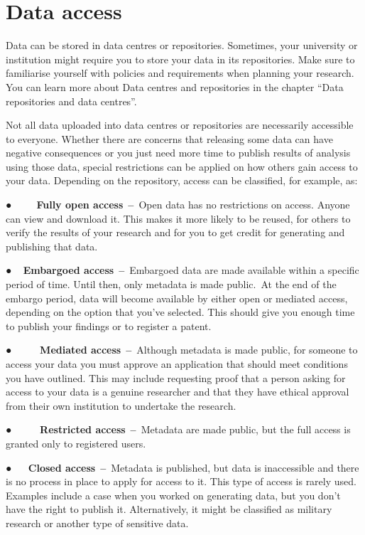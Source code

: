 \documentclass[
]{book}
\begin{document}
\hypertarget{data-access}{%
\section{\texorpdfstring{\textbf{Data access}}{Data access}}\label{data-access}}

Data can be stored in data centres or repositories. Sometimes, your university or institution might require you to store your data in its repositories. Make sure to familiarise yourself with policies and requirements when planning your research. You can learn more about Data centres and repositories in the chapter ``Data repositories and data centres''.

Not all data uploaded into data centres or repositories are necessarily accessible to everyone. Whether there are concerns that releasing some data can have negative consequences or you just need more time to publish results of analysis using those data, special restrictions can be applied on how others gain access to your data. Depending on the repository, access can be classified, for example, as:

● ~ ~ ~\textbf{Fully open access}~\textbf{--}~Open data has no restrictions on access. Anyone can view and download it. This makes it more likely to be reused, for others to verify the results of your research and for you to get credit for generating and publishing that data.

● ~ \textbf{Embargoed access}~\textbf{--}~Embargoed data are made available within a specific period of time. Until then, only metadata is made public.~At the end of the embargo period, data will become available by either open or mediated access, depending on the option that you've selected. This should give you enough time to publish your findings or to register a patent.

● ~ ~ ~ \textbf{Mediated access}~\textbf{--}~Although metadata is made public, for someone to access your data you must approve an application that should meet conditions you have outlined. This may include requesting proof that a person asking for access to your data is a genuine researcher and that they have ethical approval from their own institution to undertake the research.

● ~ ~ ~ \textbf{Restricted access}~\textbf{--}~Metadata are made public, but the full access is granted only to registered users.

● ~ ~\textbf{Closed access}~\textbf{--}~Metadata is published, but data is inaccessible and there is no process in place to apply for access to it. This type of access is rarely used. Examples include a case when you worked on generating data, but you don't have the right to publish it. Alternatively, it might be classified as military research or another type of sensitive data.
\end{document}
